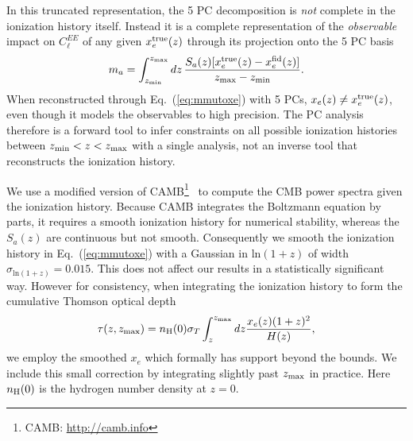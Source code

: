 \documentclass[prd,twocolumn,amsmath,amssymb,floatfix,superscriptaddress,nofootinbib]{revtex4-1}
\newcommand{\xef}{x_e^{\rm fid}}
\newcommand{\zmax}{z_{\rm max}}
\newcommand{\zmin}{z_{\rm min}}
\begin{document}
In this truncated representation, the 5 PC decomposition is {\it not} complete in the ionization history itself.   
Instead it is a complete representation of the {\it observable} impact on $C_\ell^{EE}$ of
any given $x_e^{\rm true}(z)$ through its projection onto the 5 PC basis
\begin{equation}
m_{a}=
  \int _{\zmin}^{\zmax} dz\, \frac{S_{a}(z) [x_e^{\rm true}(z)-\xef(z)]}{\zmax-\zmin} .
\label{eq:xetommu}
\end{equation}
When reconstructed through Eq.~(\ref{eq:mmutoxe}) with 5 PCs, $x_e(z) \ne x_e^{\rm true}(z)$, even 
though it models the observables to high precision.   The PC analysis therefore
is a forward tool to infer constraints on all possible ionization histories between $z_{\rm min}<z<z_{\rm max}$ with a single analysis, not an inverse tool that reconstructs the ionization history.

We use a modified version of CAMB\footnote{CAMB: \url{http://camb.info}}~\cite{Lewis:1999bs, Howlett:2012mh} to compute the CMB power spectra given the ionization history.  
Because CAMB integrates the Boltzmann equation by parts, it requires a smooth ionization 
history for numerical stability, whereas the $S_a(z)$ are continuous but not smooth.    Consequently we smooth the ionization history in Eq.~(\ref{eq:mmutoxe}) with a 
Gaussian in $\mathrm{ln}(1+z)$ of width $\sigma_{\mathrm{ln}(1+z)} = 0.015$.   This does not affect our results in a statistically significant way.  
However for consistency,
when integrating the ionization history to form the cumulative
Thomson optical depth 
\begin{equation}
\tau(z,z_{\rm max}) = n_{\rm H}(0) \sigma_T \int_z^{z_{\rm max}} dz \frac{x_e(z) (1+z)^{2} }{H(z)} ,
\label{eq:cumtau}
\end{equation}
 we employ the smoothed $x_e$ which
formally has support beyond the bounds. 
 We include this small correction by integrating
slightly past $z_{\rm max}$ in practice.  Here $n_{\rm H}(0)$ is the hydrogen number density at $z=0$.
\end{document}
